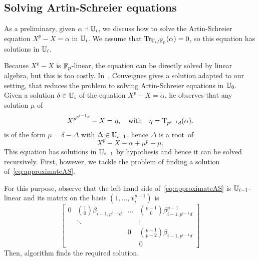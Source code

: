 \subsection{Solving Artin-Schreier equations} 

As a preliminary, given $\alpha\dashv \mathbb{U}_i$, we discuss how to
solve the Artin-Schreier equation $X^p-X=\alpha$ in $\mathbb{U}_i$. We assume
that $\operatorname{Tr}_{\mathbb{U}_i/\mathbb{F}_p}(\alpha)=0$, so this equation has solutions in
$\mathbb{U}_i$.

Because $X^p-X$ is $\mathbb{F}_p$-linear, the equation can be directly solved
by linear algebra, but this is too costly. In~\cite{Couveignes00},
Couveignes gives a solution adapted to our setting, that reduces the
problem to solving Artin-Schreier equations in $\mathbb{U}_0$. Given a solution
$\delta\in\mathbb{U}_i$ of the equation $X^p - X = \alpha$, he observes that 
any solution $\mu$ of
\begin{equation}
  \label{eq:approximateAS}
  X^{p^{p^{i-1}d}} - X = \eta, \quad\text{with}\quad \eta=\operatorname{T}_{p^{i-1}d}(\alpha).
\end{equation}
is of the form $\mu=\delta - \Delta$ with $\Delta\in\mathbb{U}_{i-1}$, hence
$\Delta$ is a \mbox{root of}
\begin{equation}
  \label{eq:approximant}
  X^p-X-\alpha+\mu^p-\mu.
\end{equation}
This equation has solutions in $\mathbb{U}_{i-1}$ by hypothesis and hence it
can be solved recursively. First, however, we tackle the problem of
finding a solution of~\eqref{eq:approximateAS}.

For this purpose, observe that the left hand side
of~\eqref{eq:approximateAS} is $\mathbb{U}_{i-1}$-linear and its matrix on the
basis $(1,\ldots,x_i^{p-1})$ is
\begin{equation*}
  \label{eq:approximate-matrix}
  \begin{bmatrix}
    0 & \binom{1}{0}\beta_{i-1,p^{i-1}d} & \hdots & \binom{p-1}{0}\beta_{i-1,p^{i-1}d}^{p-1} \\
      & \ddots          &        & \vdots               \\
      &                 & 0      &\binom{p-1}{p-2}\beta_{i-1,p^{i-1}d} \\
      &                 &        & 0
  \end{bmatrix}
\end{equation*}
Then, algorithm  finds the required solution.





